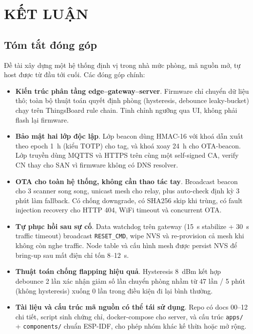 \chapter{KẾT LUẬN}
\label{Chapter6}

\section{Tóm tắt đóng góp}

Đề tài xây dựng một hệ thống định vị trong nhà mức phòng, mã nguồn mở, tự host được từ đầu tới cuối. Các đóng góp chính:

\begin{itemize}
    \item \textbf{Kiến trúc phân tầng edge--gateway--server}. Firmware chỉ chuyển dữ liệu thô; toàn bộ thuật toán quyết định phòng (hysteresis, debounce leaky-bucket) chạy trên ThingsBoard rule chain. Tinh chỉnh ngưỡng qua UI, không phải flash lại firmware.
    \item \textbf{Bảo mật hai lớp độc lập}. Lớp beacon dùng HMAC-16 với khoá dẫn xuất theo epoch 1~h (kiểu TOTP) cho tag, và khoá xoay 24~h cho OTA-beacon. Lớp truyền dùng MQTTS và HTTPS trên cùng một self-signed CA, verify CN thay cho SAN vì firmware không có DNS resolver.
    \item \textbf{OTA cho toàn hệ thống, không cần thao tác tay}. Broadcast beacon cho 3 scanner song song, unicast mesh cho relay, plus auto-check định kỳ 3 phút làm fallback. Có chống downgrade, có SHA256 skip khi trùng, có fault injection recovery cho HTTP 404, WiFi timeout và concurrent OTA.
    \item \textbf{Tự phục hồi sau sự cố}. Data watchdog trên gateway (15~s stabilize + 30~s traffic timeout) broadcast \texttt{RESET\_CMD}, wipe NVS và re-provision cả mesh khi không còn nghe traffic. Node table và cấu hình mesh được persist NVS để bring-up sau mất điện chỉ tốn 8--12~s.
    \item \textbf{Thuật toán chống flapping hiệu quả}. Hysteresis 8~dBm kết hợp debounce 2 lần xác nhận giảm số lần chuyển phòng nhầm từ 47 lần / 5 phút (không hysteresis) xuống 0 lần trong điều kiện đi lại bình thường.
    \item \textbf{Tài liệu và cấu trúc mã nguồn có thể tái sử dụng}. Repo có docs 00--12 chi tiết, script sinh chứng chỉ, docker-compose cho server, và cấu trúc \texttt{apps/} + \texttt{components/} chuẩn ESP-IDF, cho phép nhóm khác kế thừa hoặc mở rộng.
\end{itemize}

